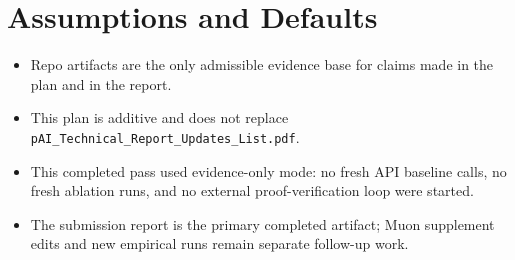 \documentclass[11pt]{article}
\begin{document}
\section*{Assumptions and Defaults}
\begin{itemize}
  \item Repo artifacts are the only admissible evidence base for claims made in the plan and in the report.
  \item This plan is additive and does not replace \texttt{pAI\_Technical\_Report\_Updates\_List.pdf}.
  \item This completed pass used evidence-only mode: no fresh API baseline calls, no fresh ablation runs, and no external proof-verification loop were started.
  \item The submission report is the primary completed artifact; Muon supplement edits and new empirical runs remain separate follow-up work.
\end{itemize}
\end{document}
